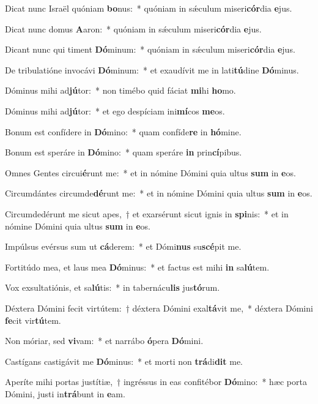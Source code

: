 \item Dicat nunc Israël quóniam \textbf{bo}nus:~* quóniam in sǽculum miseri\textbf{cór}dia \textbf{e}jus.
\item Dicat nunc domus \textbf{A}aron:~* quóniam in sǽculum miseri\textbf{cór}dia \textbf{e}jus.
\item Dicant nunc qui timent \textbf{Dó}minum:~* quóniam in sǽculum miseri\textbf{cór}dia \textbf{e}jus.
\item De tribulatióne invocávi \textbf{Dó}minum:~* et exaudívit me in lati\textbf{tú}dine \textbf{Dó}minus.
\item Dóminus mihi ad\textbf{jú}tor:~* non timébo quid fáciat \textbf{mi}hi \textbf{ho}mo.
\item Dóminus mihi ad\textbf{jú}tor:~* et ego despíciam ini\textbf{mí}cos \textbf{me}os.
\item Bonum est confídere in \textbf{Dó}mino:~* quam confíde\textbf{re} in \textbf{hó}mine.
\item Bonum est speráre in \textbf{Dó}mino:~* quam speráre \textbf{in} prin\textbf{cí}pibus.
\item Omnes Gentes circui\textbf{é}runt me:~* et in nómine Dómini quia ultus \textbf{sum} in \textbf{e}os.
\item Circumdántes circumde\textbf{dé}runt me:~* et in nómine Dómini quia ultus \textbf{sum} in \textbf{e}os.
\item Circumdedérunt me sicut apes,~† et exarsérunt sicut ignis in \textbf{spi}nis:~* et in nómine Dómini quia ultus \textbf{sum} in \textbf{e}os.
\item Impúlsus evérsus sum ut \textbf{cá}derem:~* et Dómi\textbf{nus} su\textbf{scé}pit me.
\item Fortitúdo mea, et laus mea \textbf{Dó}minus:~* et factus est mihi \textbf{in} sa\textbf{lú}tem.
\item Vox exsultatiónis, et sa\textbf{lú}tis:~* in tabernácu\textbf{lis} jus\textbf{tó}rum.
\item Déxtera Dómini fecit virtútem:~† déxtera Dómini exal\textbf{tá}vit me,~* déxtera Dómini \textbf{fe}cit vir\textbf{tú}tem.
\item Non móriar, sed \textbf{vi}vam:~* et narrábo \textbf{ó}pera \textbf{Dó}mini.
\item Castígans castigávit me \textbf{Dó}minus:~* et morti non \textbf{trá}di\textbf{dit} me.
\item Aperíte mihi portas justítiæ,~† ingréssus in eas confitébor \textbf{Dó}mino:~* hæc porta Dómini, justi in\textbf{trá}bunt in \textbf{e}am.
